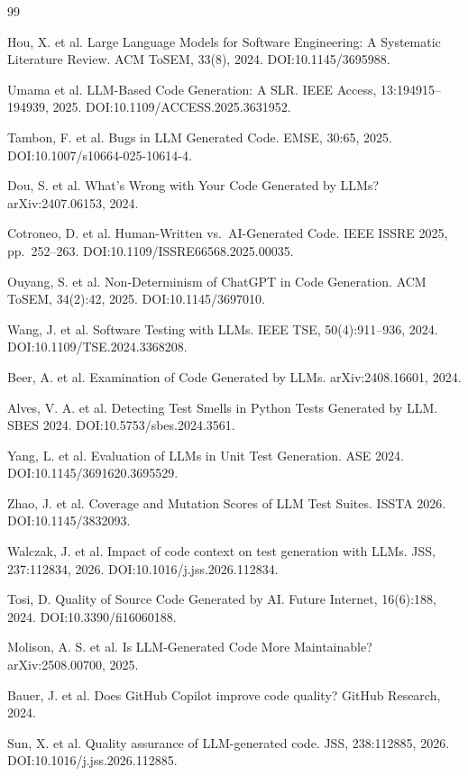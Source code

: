 \documentclass[10pt,twocolumn]{article}
\begin{document}
\begin{thebibliography}{99}

 Hou, X. et al. Large Language Models for Software Engineering: A Systematic Literature Review. ACM ToSEM, 33(8), 2024. DOI:10.1145/3695988.

 Umama et al. LLM-Based Code Generation: A SLR. IEEE Access, 13:194915--194939, 2025. DOI:10.1109/ACCESS.2025.3631952.

 Tambon, F. et al. Bugs in LLM Generated Code. EMSE, 30:65, 2025. DOI:10.1007/s10664-025-10614-4.

 Dou, S. et al. What's Wrong with Your Code Generated by LLMs? arXiv:2407.06153, 2024.

 Cotroneo, D. et al. Human-Written vs.\ AI-Generated Code. IEEE ISSRE 2025, pp.\ 252--263. DOI:10.1109/ISSRE66568.2025.00035.

 Ouyang, S. et al. Non-Determinism of ChatGPT in Code Generation. ACM ToSEM, 34(2):42, 2025. DOI:10.1145/3697010.

 Wang, J. et al. Software Testing with LLMs. IEEE TSE, 50(4):911--936, 2024. DOI:10.1109/TSE.2024.3368208.

 Beer, A. et al. Examination of Code Generated by LLMs. arXiv:2408.16601, 2024.

 Alves, V. A. et al. Detecting Test Smells in Python Tests Generated by LLM. SBES 2024. DOI:10.5753/sbes.2024.3561.

 Yang, L. et al. Evaluation of LLMs in Unit Test Generation. ASE 2024. DOI:10.1145/3691620.3695529.

 Zhao, J. et al. Coverage and Mutation Scores of LLM Test Suites. ISSTA 2026. DOI:10.1145/3832093.

 Walczak, J. et al. Impact of code context on test generation with LLMs. JSS, 237:112834, 2026. DOI:10.1016/j.jss.2026.112834.

 Tosi, D. Quality of Source Code Generated by AI. Future Internet, 16(6):188, 2024. DOI:10.3390/fi16060188.

 Molison, A. S. et al. Is LLM-Generated Code More Maintainable? arXiv:2508.00700, 2025.

 Bauer, J. et al. Does GitHub Copilot improve code quality? GitHub Research, 2024.

 Sun, X. et al. Quality assurance of LLM-generated code. JSS, 238:112885, 2026. DOI:10.1016/j.jss.2026.112885.


\end{thebibliography}
\end{document}
